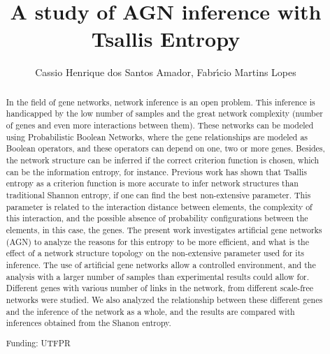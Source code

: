\documentclass[twoside]{article}
\title{\vspace{-15mm}\fontsize{24pt}{10pt}\selectfont\textbf{ A study of AGN inference with Tsallis Entropy }} %
\author{ Cassio Henrique dos Santos Amador, Fabr\'{\i}cio Martins Lopes }
\affil{ Universidade Tecnol\'ogica Federal do Paran\'a }
\date{}
\begin{document}
  
  
  \maketitle %
  
  
  \thispagestyle{fancy} %
  
  
  \begin{abstract}
  In the field of gene networks,  network inference is an open problem. This inference is handicapped by the low number of samples and the great network complexity (number of genes and even more interactions between them). These networks can be modeled using Probabilistic Boolean Networks,  where the gene relationships are modeled as Boolean operators,  and these operators can depend on one,  two or more genes. Besides,  the network structure can be inferred if the correct criterion function is chosen,  which can be the information entropy,  for instance. Previous work has shown that Tsallis entropy as a criterion function is more accurate to infer network structures than traditional Shannon entropy,  if one can find the best non-extensive parameter. This parameter is related to the interaction distance between elements,  the complexity of this interaction,  and the possible absence of probability configurations between the elements,  in this case,  the genes. The present work investigates artificial gene networks (AGN) to analyze the reasons for this entropy to be more efficient,  and what is the effect of a network structure topology on the non-extensive parameter used for its inference. The use of artificial gene networks allow a controlled environment,  and the analysis with a larger number of samples than experimental results could allow for. Different genes with various number of links in the network,  from different scale-free networks were studied. We also analyzed the relationship between these different genes and the inference of the network as a whole,  and the results are compared with inferences obtained from the Shanon entropy.
  
  Funding: UTFPR \\ 
  \end{abstract}
  
\end{document}
